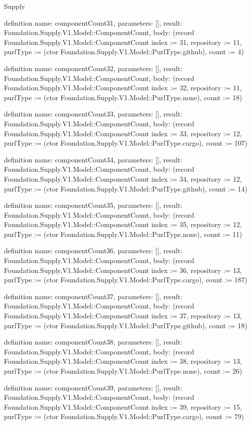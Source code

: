 \begin{lexlean}{Supply}
\begin{semanticmodule}
definition{
  name: componentCount31,
  parameters: [],
  result: Foundation.Supply.V1.Model::ComponentCount,
  body: (record Foundation.Supply.V1.Model::ComponentCount {index := 31, repository := 11, purlType := (ctor Foundation.Supply.V1.Model::PurlType.github), count := 4})
}

definition{
  name: componentCount32,
  parameters: [],
  result: Foundation.Supply.V1.Model::ComponentCount,
  body: (record Foundation.Supply.V1.Model::ComponentCount {index := 32, repository := 11, purlType := (ctor Foundation.Supply.V1.Model::PurlType.none), count := 18})
}

definition{
  name: componentCount33,
  parameters: [],
  result: Foundation.Supply.V1.Model::ComponentCount,
  body: (record Foundation.Supply.V1.Model::ComponentCount {index := 33, repository := 12, purlType := (ctor Foundation.Supply.V1.Model::PurlType.cargo), count := 107})
}

definition{
  name: componentCount34,
  parameters: [],
  result: Foundation.Supply.V1.Model::ComponentCount,
  body: (record Foundation.Supply.V1.Model::ComponentCount {index := 34, repository := 12, purlType := (ctor Foundation.Supply.V1.Model::PurlType.github), count := 14})
}

definition{
  name: componentCount35,
  parameters: [],
  result: Foundation.Supply.V1.Model::ComponentCount,
  body: (record Foundation.Supply.V1.Model::ComponentCount {index := 35, repository := 12, purlType := (ctor Foundation.Supply.V1.Model::PurlType.none), count := 11})
}

definition{
  name: componentCount36,
  parameters: [],
  result: Foundation.Supply.V1.Model::ComponentCount,
  body: (record Foundation.Supply.V1.Model::ComponentCount {index := 36, repository := 13, purlType := (ctor Foundation.Supply.V1.Model::PurlType.cargo), count := 187})
}

definition{
  name: componentCount37,
  parameters: [],
  result: Foundation.Supply.V1.Model::ComponentCount,
  body: (record Foundation.Supply.V1.Model::ComponentCount {index := 37, repository := 13, purlType := (ctor Foundation.Supply.V1.Model::PurlType.github), count := 18})
}

definition{
  name: componentCount38,
  parameters: [],
  result: Foundation.Supply.V1.Model::ComponentCount,
  body: (record Foundation.Supply.V1.Model::ComponentCount {index := 38, repository := 13, purlType := (ctor Foundation.Supply.V1.Model::PurlType.none), count := 26})
}

definition{
  name: componentCount39,
  parameters: [],
  result: Foundation.Supply.V1.Model::ComponentCount,
  body: (record Foundation.Supply.V1.Model::ComponentCount {index := 39, repository := 15, purlType := (ctor Foundation.Supply.V1.Model::PurlType.cargo), count := 79})
}


\end{semanticmodule}
\end{lexlean}
